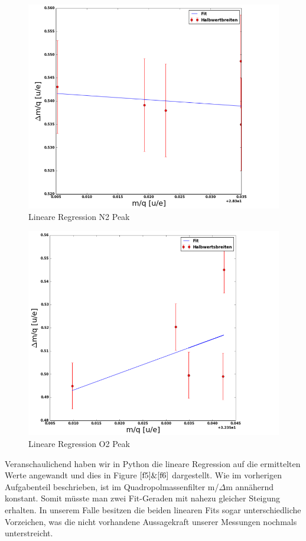 \documentclass[10pt,a4paper]{article}
\begin{document}
\begin{figure}[h]
	\includegraphics[scale = 0.5]{linpeak1.png}
	\centering
	\caption{Lineare Regression N2 Peak}
	\label{f5}
\end{figure}
\begin{figure}[h]
	\includegraphics[scale = 0.5]{linpeak2.png}
	\centering
	\caption{Lineare Regression O2 Peak}
	\label{f6}
\end{figure}


Veranschaulichend haben wir in Python die lineare Regression auf die ermittelten Werte angewandt und dies in Figure $\ref{f5} \& \ref{f6}$ dargestellt. Wie im vorherigen Aufgabenteil beschrieben, ist im Quadropolmassenfilter m/$\Delta$m annähernd konstant. Somit müsste man zwei Fit-Geraden mit nahezu gleicher Steigung erhalten. In unserem Falle besitzen die beiden linearen Fits sogar unterschiedliche Vorzeichen, was die nicht vorhandene Aussagekraft unserer Messungen nochmals unterstreicht. 
\end{document}
